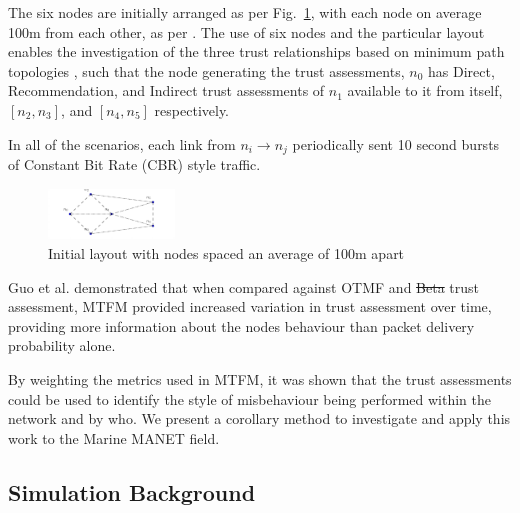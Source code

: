\documentclass[conference]{IEEEtran}
\providecommand{\DIFadd}[1]{{\protect\color{blue}\uwave{#1}}} %
\providecommand{\DIFdel}[1]{{\protect\color{red}\sout{#1}}}                      %
\providecommand{\DIFaddbegin}{} %
\providecommand{\DIFaddend}{} %
\providecommand{\DIFdelbegin}{} %
\providecommand{\DIFdelend}{} %
\begin{document}
The six nodes are initially arranged as per Fig.~\ref{fig:s1_layout}, with each node on average 100m from each other, as per \cite{Guo11}.
The use of six nodes and the particular layout enables the investigation of the three trust relationships based on minimum path topologies\DIFdelbegin %
\DIFdelend , such that the node generating the trust assessments, $n_0$ has Direct, Recommendation, and Indirect trust assessments of $n_1$ available to it from itself, $[n_2,n_3]$, and $[n_4,n_5]$ respectively.
\DIFaddbegin {}
\DIFaddend 

In all of the scenarios, each link from $n_i \rightarrow n_j$ periodically sent 10 second bursts of Constant Bit Rate (CBR) style traffic.
%
\begin{figure}[h]
  \centering
  \includegraphics[width=0.3\textwidth]{img/s1_layout}
  \caption{Initial layout with nodes spaced an average of 100m apart}
  \label{fig:s1_layout}
\end{figure}
%
Guo et al. demonstrated that when compared against OTMF and \DIFdelbegin \DIFdel{Beta }\DIFdelend \DIFaddbegin \DIFadd{Hermes }\DIFaddend trust assessment, MTFM provided increased variation in trust assessment over time, providing more information about the nodes behaviour than packet delivery probability alone.
\DIFaddbegin 

\DIFaddend By weighting the metrics used in MTFM, it was shown that the trust assessments could be used to identify the style of misbehaviour being performed within the network and by who.
We present a corollary method to investigate and apply this work to the Marine MANET field.
\DIFaddbegin {}
\DIFaddend 

\subsection{Simulation Background}
\end{document}
